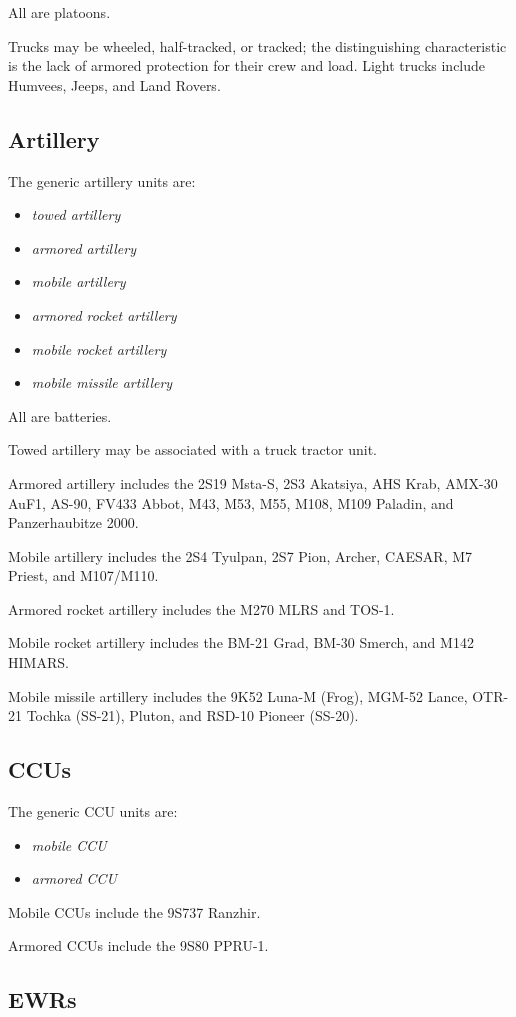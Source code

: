 \documentclass[10pt]{article}
\newcommand{\groundunittype}[1]{\subsection{#1}}
\begin{document}
All are platoons. 

Trucks may be wheeled, half-tracked, or tracked; the distinguishing characteristic is the lack of armored protection for their crew and load. Light trucks include Humvees, Jeeps, and Land Rovers.


\groundunittype{Artillery}


The generic artillery units are:
\begin{itemize}
\item \emph{towed artillery}
\item \emph{armored artillery}
\item \emph{mobile artillery}
\item \emph{armored rocket artillery}
\item \emph{mobile rocket artillery}
\item \emph{mobile missile artillery}
\end{itemize}

All are batteries.

Towed artillery may be associated with a truck tractor unit.

Armored artillery includes the 
2S19 Msta-S, 
2S3 Akatsiya, 
AHS Krab, 
AMX-30 AuF1, 
AS-90,
FV433 Abbot, 
M43, 
M53, 
M55,
M108,
M109 Paladin, 
and Panzerhaubitze 2000.


Mobile artillery includes
the 
2S4 Tyulpan,
2S7 Pion,
Archer,
CAESAR,
M7 Priest,
and
M107/M110.

Armored rocket artillery includes the M270 MLRS and TOS-1.

Mobile rocket artillery includes the 
BM-21 Grad,
BM-30 Smerch,
and
M142 HIMARS.

Mobile missile artillery includes the 
9K52 Luna-M (Frog), 
MGM-52 Lance, 
OTR-21 Tochka (SS-21), 
Pluton,
and
RSD-10 Pioneer (SS-20).

\subsection{CCUs}

The generic CCU units are:
\begin{itemize}
\item \emph{mobile CCU}
\item \emph{armored CCU}
\end{itemize}

Mobile CCUs include the 9S737 Ranzhir.

Armored CCUs include the 9S80 PPRU-1.

\subsection{EWRs}
\end{document}
